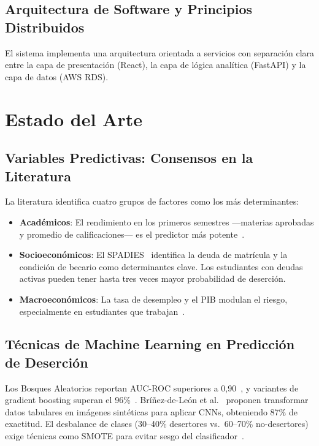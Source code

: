 \documentclass[12pt]{article}
\begin{document}
{%
\subsection{Arquitectura de Software y Principios Distribuidos}

El sistema implementa una arquitectura orientada a servicios con separación clara entre
la capa de presentación (React), la capa de lógica analítica (FastAPI) y la capa de
datos (AWS RDS).

\section{Estado del Arte}

\subsection{Variables Predictivas: Consensos en la Literatura}

La literatura identifica cuatro grupos de factores como los más determinantes:

\begin{itemize}
    \item \textbf{Académicos}: El rendimiento en los primeros semestres —materias
    aprobadas y promedio de calificaciones— es el predictor más potente~\cite{perez2020}.

    \item \textbf{Socioeconómicos}: El SPADIES~\cite{men2008} identifica la deuda de
    matrícula y la condición de becario como determinantes clave. Los estudiantes con
    deudas activas pueden tener hasta tres veces mayor probabilidad de deserción.

    \item \textbf{Macroeconómicos}: La tasa de desempleo y el PIB modulan el riesgo,
    especialmente en estudiantes que trabajan~\cite{men2008}.
\end{itemize}

\subsection{Técnicas de Machine Learning en Predicción de Deserción}

Los Bosques Aleatorios reportan AUC-ROC superiores a 0,90~\cite{perez2020}, y variantes
de gradient boosting superan el 96\%~\cite{brinez2025}. Bríñez-de-León et
al.~\cite{brinez2025} proponen transformar datos tabulares en imágenes sintéticas para
aplicar CNNs, obteniendo 87\% de exactitud. El desbalance de clases (30--40\% desertores
vs.\ 60--70\% no-desertores) exige técnicas como SMOTE para evitar sesgo del
clasificador~\cite{perez2020}.

}
\end{document}
